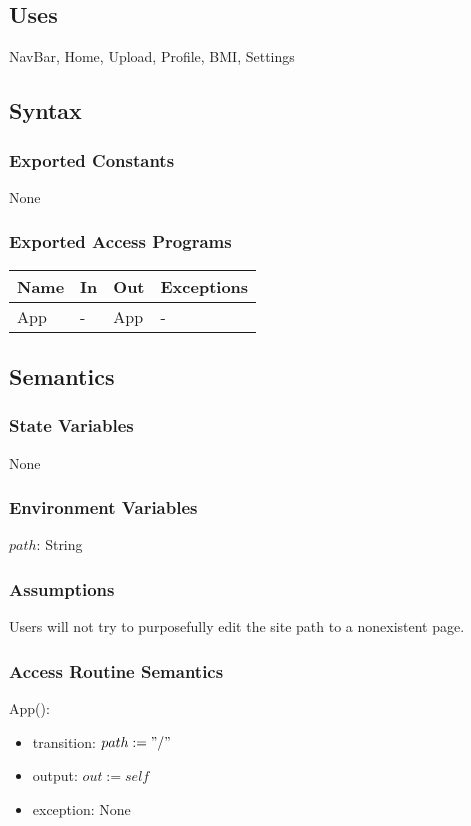 \documentclass[12pt, titlepage]{article}
\begin{document}
\subsection{Uses}
NavBar, Home, Upload, Profile, BMI, Settings
\subsection{Syntax}
\subsubsection{Exported Constants}
None
\subsubsection{Exported Access Programs}
\begin{center}
	\begin{tabular}{p{3cm} p{4cm} p{4cm} p{3cm}}
		
		\hline
		\textbf{Name} & \textbf{In} & \textbf{Out} & \textbf{Exceptions} \\
		\hline
		App & - & App & - \\
		\hline
	\end{tabular}
\end{center}
\subsection{Semantics}
\subsubsection{State Variables}
None
\subsubsection{Environment Variables}
$path$: String
\subsubsection{Assumptions}
Users will not try to purposefully edit the site path to a nonexistent page.
\subsubsection{Access Routine Semantics}
App():
\begin{itemize}
	\item transition: $path := "/"$
	\item output: $out := self$
	\item exception: None
\end{itemize}
\end{document}
